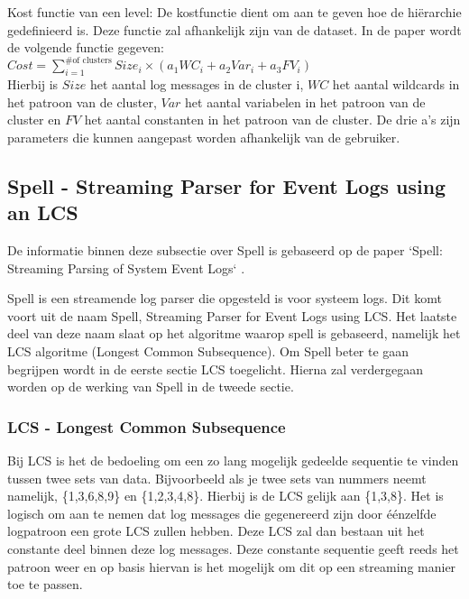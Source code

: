 \begin{itemize}
    \subitem Kost functie van een level: De kostfunctie dient om aan te geven hoe de hiërarchie gedefinieerd is. Deze functie zal afhankelijk zijn van de dataset. In de paper wordt de volgende functie gegeven:\\
    \(Cost = \sum_{i=1}^{\text{\# of clusters}} Size_{i} \times (a_{1}WC_{i} + a_{2}Var_{i} + a_{3}FV_{i})\)\\
    
    Hierbij is $Size$ het aantal log messages in de cluster i, $WC$ het aantal wildcards in het patroon van de cluster, $Var$ het aantal variabelen in het patroon van de cluster en $FV$ het aantal constanten in het patroon van de cluster. De drie a's zijn parameters die kunnen aangepast worden afhankelijk van de gebruiker.
\end{itemize}

\subsection{Spell - Streaming Parser for Event Logs using an LCS}
De informatie binnen deze subsectie over Spell is gebaseerd op de paper `Spell: Streaming Parsing of System Event Logs` \autocite{du2016spell}.

Spell is een streamende log parser die opgesteld is voor systeem logs. Dit komt voort uit de naam Spell, Streaming Parser for Event Logs using LCS. Het laatste deel van deze naam slaat op het algoritme waarop spell is gebaseerd, namelijk het LCS algoritme (Longest Common Subsequence). Om Spell beter te gaan begrijpen wordt in de eerste sectie LCS toegelicht. Hierna zal verdergegaan worden op de werking van Spell in de tweede sectie.

\subsubsection{LCS - Longest Common Subsequence}
Bij LCS is het de bedoeling om een zo lang mogelijk gedeelde sequentie te vinden tussen twee sets van data. Bijvoorbeeld als je twee sets van nummers neemt namelijk, \{1,3,6,8,9\} en \{1,2,3,4,8\}. Hierbij is de LCS gelijk aan \{1,3,8\}. Het is logisch om aan te nemen dat log messages die gegenereerd zijn door éénzelfde logpatroon een grote LCS zullen hebben. Deze LCS zal dan bestaan uit het constante deel binnen deze log messages. Deze constante sequentie geeft reeds het patroon weer en op basis hiervan is het mogelijk om dit op een streaming manier toe te passen.


